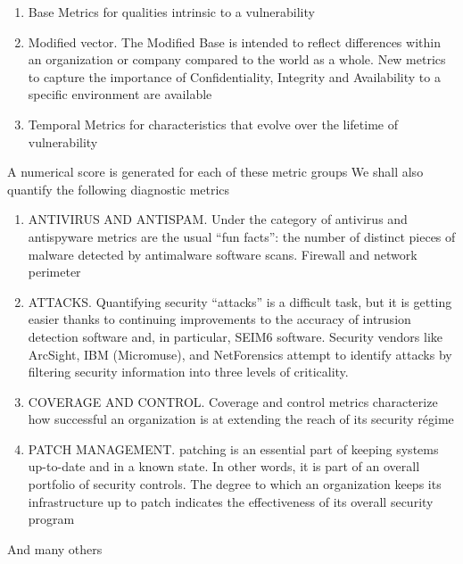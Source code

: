 \documentclass{article}
\begin{document}
\begin{enumerate}
\item Base Metrics for qualities intrinsic to a vulnerability
\item Modified vector. The Modified Base is intended to reflect differences within an organization or company compared to the world as a whole. New metrics to capture the importance of Confidentiality, Integrity and Availability to a specific environment are available
\item	Temporal Metrics for characteristics that evolve over the lifetime of vulnerability
\end{enumerate}
A numerical score is generated for each of these metric groups
\linebreak
\linebreak
We shall also quantify the following diagnostic metrics
\begin{enumerate}
\item ANTIVIRUS AND ANTISPAM.
Under the category of antivirus and antispyware metrics are the usual “fun facts”: the
number of distinct pieces of malware detected by antimalware software scans.
Firewall and network perimeter

\item ATTACKS.
Quantifying security “attacks” is a difficult task, but it is getting easier thanks to continuing
improvements to the accuracy of intrusion detection software and, in particular,
SEIM6 software. Security vendors like ArcSight, IBM (Micromuse), and NetForensics
attempt to identify attacks by filtering security information into three levels of criticality.

\item COVERAGE AND CONTROL.
Coverage and control metrics characterize how successful an organization is at extending
the reach of its security régime

\item PATCH MANAGEMENT.
patching is an essential part of keeping systems up-to-date and in a known
state. In other words, it is part of an overall portfolio of security controls. The degree to
which an organization keeps its infrastructure up to patch indicates the effectiveness of
its overall security program
\end{enumerate}

And many others
\end{document}
